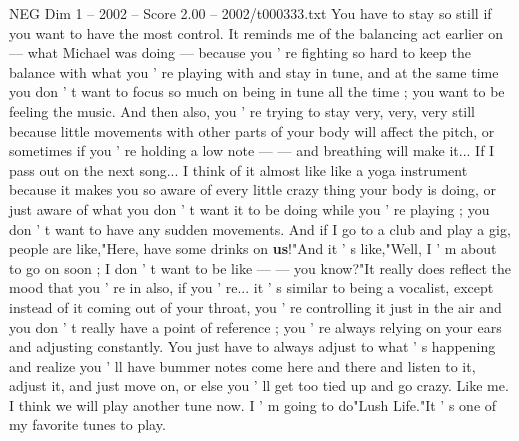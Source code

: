 \begin{textsample}{NEG Dim 1 – 2002 – Score 2.00 – 2002/t000333.txt}
You have to stay so still if you want to have the most control.
It reminds me of the balancing act earlier on — what Michael was doing — because you ' re fighting so hard to keep the balance with what you ' re playing with and stay in tune, and at the same time you don ' t want to focus so much on being in tune all the time ; you want to be feeling the music.
And then also, you ' re trying to stay very, very, very still because little movements with other parts of your body will affect the pitch, or sometimes if you ' re holding a low note — — and breathing will make it...
If I pass out on the next song...
I think of it almost like like a yoga instrument because it makes you so aware of every little crazy thing your body is doing, or just aware of what you don ' t want it to be doing while you ' re playing ; you don ' t want to have any sudden movements.
And if I go to a club and play a gig, people are like,"Here, have some drinks on \textbf{us}!"And it ' s like,"Well, I ' m about to go on soon ; I don ' t want to be like — — you know?"It really does reflect the mood that you ' re in also, if you ' re... it ' s similar to being a vocalist, except instead of it coming out of your throat, you ' re controlling it just in the air and you don ' t really have a point of reference ; you ' re always relying on your ears and adjusting constantly.
You just have to always adjust to what ' s happening and realize you ' ll have bummer notes come here and there and listen to it, adjust it, and just move on, or else you ' ll get too tied up and go crazy.
Like me.
I think we will play another tune now.
I ' m going to do"Lush Life."It ' s one of my favorite tunes to play.

\end{textsample}
